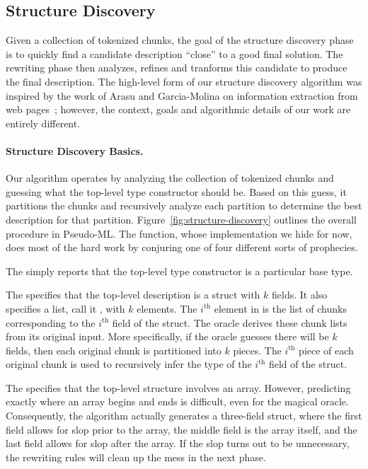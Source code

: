 \subsection {Structure Discovery}

Given a collection of tokenized chunks, the goal of the structure
discovery phase is to quickly find a candidate description ``close'' to
a good final solution.  The rewriting phase then analyzes, refines and
tranforms this candidate to produce the final description.
The high-level form of our structure discovery algorithm was
inspired by the work of Arasu and 
Garcia-Molina on information extraction from web pages~\cite{arasu+:sigmod03};
however, the context, goals and algorithmic details of our
work are entirely different.


\paragraph*{Structure Discovery Basics.}
Our algorithm operates by analyzing the collection of tokenized chunks
and guessing what the top-level type constructor should be.  Based on
this guess, it partitions the chunks and recursively analyze each partition
to determine the best description for that partition.
Figure~\ref{fig:structure-discovery} outlines the
overall procedure in Pseudo-ML.  The  function,
whose implementation we hide for now, does most of the hard work by
conjuring one of four different sorts of prophecies.  

The  simply reports that the top-level type
constructor is a particular base type.

The  specifies that the top-level description is a
struct with $k$ fields.  It also
specifies a list, call it , with $k$ elements.  The
$i^{\mathrm{th}}$ element in  is the list of chunks
corresponding to the $i^{\mathrm{th}}$ field of the struct.  The
oracle derives these chunk lists from its original input. More
specifically, if the oracle guesses there will be $k$ fields, then
each original chunk is partitioned into $k$ pieces. The
$i^{\mathrm{th}}$ piece of each original chunk is used to recursively
infer the type of the $i^{\mathrm{th}}$ field of the struct.

The  specifies that the top-level structure involves
an array.  However, predicting exactly where an array begins and ends
is difficult, even for the magical oracle.  Consequently, the
algorithm actually generates a three-field struct, where the first
field allows for slop prior to the array, the middle field is the
array itself, and the last field allows for slop after the array.  If
the slop turns out to be unnecessary, the rewriting rules will clean
up the mess in the next phase.

